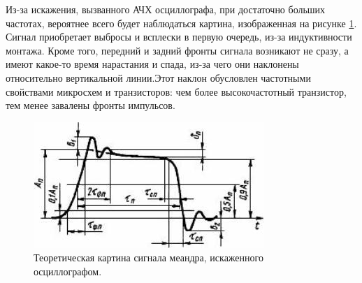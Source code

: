 \documentclass[12pt,a4paper]{article}
\begin{document}
	Из-за искажения, вызванного АЧХ осциллографа, при достаточно больших частотах, вероятнее всего будет наблюдаться картина, изображенная на рисунке \ref{fig:meandr_teor}. Сигнал приобретает выбросы и всплески в первую очередь, из-за индуктивности монтажа. Кроме того, передний и задний фронты сигнала возникают не сразу, а имеют какое-то время нарастания и спада, из-за чего они наклонены относительно вертикальной линии.Этот наклон обусловлен частотными свойствами микросхем и транзисторов: чем более высокочастотный транзистор, тем менее завалены фронты импульсов.
	\begin{figure}[h!]
		\begin{center}
			\includegraphics[height = 0.14\textheight]{meandr_illustration}
			\caption{Теоретическая картина сигнала меандра, искаженного осциллографом.}
			\label{fig:meandr_teor}
		\end{center}			
	\end{figure}
	
\end{document}
